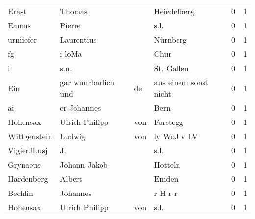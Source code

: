 \documentclass[10pt,a4paper,landscape]{article}
\begin{document}
\begin{longtable}{llllrr}
                    Erast &                             Thomas &             &                                 Heiedelberg &          0 &         1 \\
                    Eamus &                             Pierre &             &                                        s.l. &          0 &         1 \\
                urniiofer &                         Laurentius &             &                                    Nürnberg &          0 &         1 \\
                       fg &                             i loMa &             &                                        Chur &          0 &         1 \\
                        i &                               s.n. &             &                                  St. Gallen &          0 &         1 \\
                      Ein &                gar wunrbarlich und &          de &                       aus einem sonst nicht &          0 &         1 \\
                       ai &                        er Johannes &             &                                        Bern &          0 &         1 \\
                 Hohensax &                     Ulrich Philipp &         von &                                    Forstegg &          0 &         1 \\
             Wittgenstein &                             Ludwig &         von &                                 ly WoJ v LV &          0 &         1 \\
              VigierJLusj &                                 J. &             &                                        s.l. &          0 &         1 \\
                 Grynaeus &                       Johann Jakob &             &                                     Hotteln &          0 &         1 \\
               Hardenberg &                             Albert &             &                                       Emden &          0 &         1 \\
                  Bechlin &                           Johannes &             &                                     r H r r &          0 &         1 \\
                 Hohensax &                     Ulrich Philipp &         von &                                        s.l. &          0 &         1 \\

\end{longtable}
\end{document}
